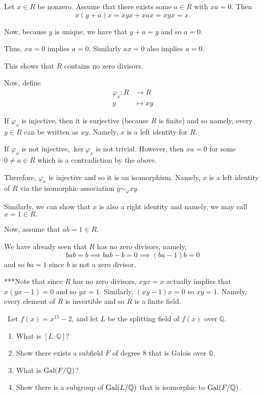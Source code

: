 \documentclass[12pt]{Qual}
\begin{document}
\begin{solution}
Let $x\in R$ be nonzero. Assume that there exists some $a\in R$ with $xa=0.$ Then $$x(y+a)x=xyx+xax=xyx=x.$$

Now, because $y$ is unique, we have that $y+a=y$ and so $a=0$.

Thus, $xa=0$ implies $a=0.$ Similarly $ax=0$ also implies $a=0$.

This shows that $R$ contains no zero divisors.

Now, define \begin{align*}
        \varphi_x: R&\to R\\
        y&\mapsto xy
    \end{align*}

If $\varphi_x$ is injective, then it is surjective (because $R$ is finite) and so namely, every $y\in R$ can be written as $xy$. Namely, $x$ is a left identity for $R.$

If $\varphi_x$ is not injective, $\ker\varphi_x$ is not trivial. However, then $xa=0$ for some $0\not=a\in R$ which is a contradiction by the above.

Therefore, $\varphi_x$ is injective and so it is an isomorphism. Namely, $x$ is a left identity of $R$ via the isomorphic association $y\sim_\varphi xy$.

Similarly, we can show that $x$ is also a right identity and namely, we may call $x=1\in R.$

Now, assume that $ab=1\in R.$

We have already seen that $R$ has no zero divisors, namely, $$bab=b\implies bab-b=0\implies (ba-1)b=0$$ and so $ba=1$ since $b$ is not a zero divisor.

\begin{mybox}
***Note that since $R$ has no zero divisors, $xyx=x$ actually implies that $x(yx-1)=0$ and so $yx=1$. Similarly, $(xy-1)x=0$ so $xy=1$. Namely, every element of $R$ is invertible and so $R$ is a finite field.
\end{mybox}

\end{solution}
\newpage



\begin{problem} $\,$
Let $f(x)=x^{15}-2$, and let $L$ be the splitting field of $f(x)$ over $\mathbb{Q}$.
\begin{enumerate}[label=(\alph*)]
    \item What is $[L:\mathbb{Q}]$?
    \item Show there exists a subfield $F$ of degree $8$ that is Galois over $\mathbb{Q}$.
    \item What is $\text{Gal}(F/\mathbb{Q})$?
    \item Show there is a subgroup of $\text{Gal}(L/\mathbb{Q})$ that is isomorphic to $\text{Gal}(F/\mathbb{Q})$.
\end{enumerate}
\end{problem}
\end{document}
